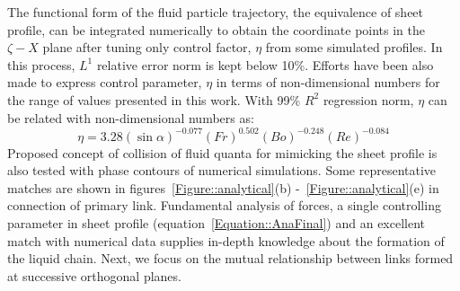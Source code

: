 \documentclass[%
 aip,
 sd,%
amsmath,amssymb,
preprint,%
author-year,%
]{revtex4-1}
\begin{document}
The functional form of the fluid particle trajectory, the equivalence of sheet profile, can be integrated numerically to obtain the coordinate points in the $\zeta-X$ plane after tuning only control factor, $\eta$ from some simulated profiles. In this process, $L^1$ relative error norm is kept below 10\%. Efforts have been also made to express control parameter, $\eta$ in terms of non-dimensional numbers for the range of values presented in this work. With 99\% $R^2$ regression norm, $\eta$ can be related with non-dimensional numbers as:
\begin{equation}\label{Equation::eta}
\eta = 3.28(\sin\alpha)^{-0.077}(Fr)^{0.502}(Bo)^{-0.248}\left(Re\right)^{-0.084}
\end{equation}
Proposed concept of collision of fluid quanta for mimicking the sheet profile is also tested with phase contours of numerical simulations. Some representative matches are shown in figures~\ref{Figure::analytical}(b) -~\ref{Figure::analytical}(e) in connection of primary link. Fundamental analysis of forces, a single controlling parameter in sheet profile (equation~\ref{Equation::AnaFinal}) and an excellent match with numerical data supplies in-depth knowledge about the {\color{red}formation} of the liquid chain. Next, we focus on the mutual relationship between links formed at successive orthogonal planes. 
\end{document}
